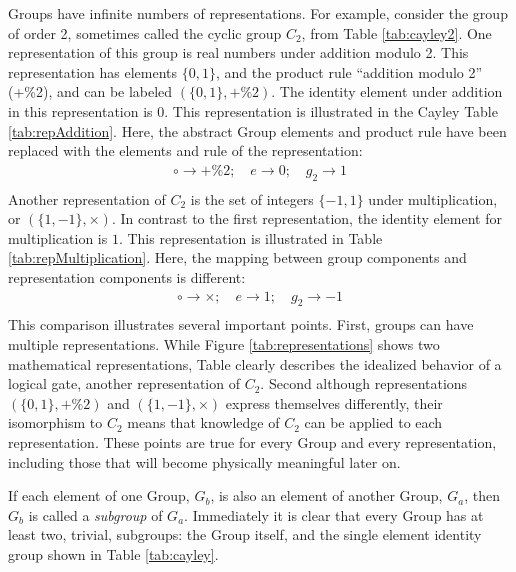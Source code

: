 Groups have infinite numbers of representations.
For example, consider the group of order 2, sometimes called the cyclic group $C_2$, from Table \ref{tab:cayley2}.
One representation of this group is real numbers under addition modulo 2.
This representation has elements $\{0,1\}$, and the product rule ``addition modulo 2'' (+\%2), and can be labeled $(\{0,1\},+\%2)$.
The identity element under addition in this representation is $0$.
This representation is illustrated in the Cayley Table \ref{tab:repAddition}. Here, the abstract Group elements and product rule have been replaced with the elements and rule of the representation:
\begin{equation}\begin{split}
    \circ\to+\%2; \quad e\to0; \quad g_2\to1 \\
\end{split}\end{equation} 
%
Another representation of $C_2$ is the set of integers $\{-1,1\}$ under multiplication, or $(\{1,-1\},\times)$.
In contrast to the first representation, the identity element for multiplication is $1$.
This representation is illustrated in Table \ref{tab:repMultiplication}. Here, the mapping between group components and representation components is different:
\begin{equation}\begin{split}
    \circ\to\times; \quad e\to1; \quad g_2\to-1 \\
\end{split}\end{equation} 
%
This comparison illustrates several important points.
First, groups can have multiple representations. While Figure \ref{tab:representations} shows two mathematical representations, Table \label{tab:repAddition} clearly describes the idealized behavior of a logical  gate, another representation of $C_2$.
Second although representations $(\{0,1\},+\%2)$ and $(\{1,-1\},\times)$ express themselves differently, their isomorphism to $C_2$ means that knowledge of $C_2$ can be applied to each representation.
These points are true for every Group and every representation, including those that will become physically meaningful later on.

If each element of one Group, $G_b$, is also an element of another Group, $G_a$, then $G_b$ is called a \emph{subgroup} of $G_a$.
Immediately it is clear that every Group has at least two, trivial, subgroups: the Group itself, and the single element identity group shown in Table \ref{tab:cayley}.


